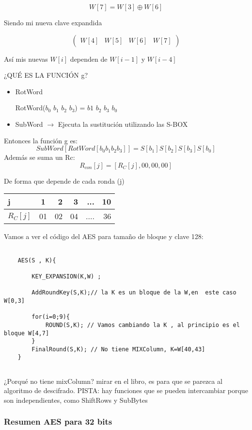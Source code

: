 	$$W[7] = W[3] \oplus W[6]$$
	
	Siendo mi nueva clave expandida
	
		$$\left(\begin{matrix}
		W[4] & W[5] & W[6] & W[7]
		\end{matrix}\right)$$
	
	Así mis nuevas $W[i]$ dependen de $W[i-1]$ y $W[i-4]$
	
	¿QUÉ ES LA FUNCIÓN g?
	\begin{itemize}
		\item RotWord
		
			RotWord($b_0$ $b_1$ $b_2$ $b_3$) = $b1$ $b_2$ $b_3$ $b_0$
		\item SubWord $\rightarrow$ Ejecuta la sustitución utilizando las S-BOX
	\end{itemize}
	
	Entonces la función g es:
	$$ SubWord[RotWord[b_0 b_1 b_2 b_3] ] = S[b_1]S[b_2]S[b_3]S[b_0]$$
	Además se suma un Rc:
	$$R_{con}[j] = [R_C[j] , 00 , 00 , 00]$$
	
	De forma que depende de cada ronda (j)
	
	\begin{tabular}{l | c | r | r | r| r}
		j & 1 & 2 & 3 & ... & 10\\
		\hline
		$R_C[j]$ & 01  & 02  & 04 & ....& 36 \\
	
		
	\end{tabular}
	
	Vamos a ver el código del AES para tamaño de bloque y clave 128:
	
	\lstset{language=C, breaklines=true, basicstyle=\footnotesize}
	\begin{lstlisting}[frame=single]
	
	AES(S , K){
	
		KEY_EXPANSION(K,W) ; 
	
		AddRoundKey(S,K);// la K es un bloque de la W,en  este caso W[0,3]
		
		for(i=0;9){
			ROUND(S,K); // Vamos cambiando la K , al principio es el bloque W[4,7]
		}
		FinalRound(S,K); // No tiene MIXColumn, K=W[40,43] 
	}
	
	\end{lstlisting}
¿Porqué no tiene mixColumn? mirar en el libro, es para que se parezca al algoritmo de descifrado.
PISTA: hay funciones que se pueden intercambiar porque son independientes, como ShiftRows y SubBytes

\subsubsection{Resumen AES para 32 bits}

